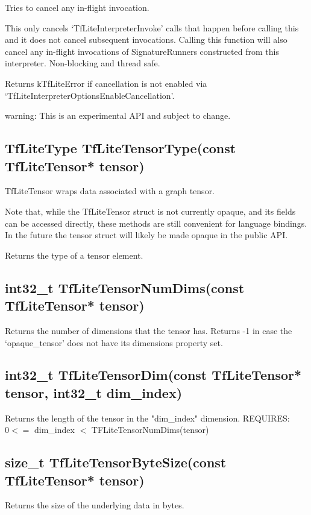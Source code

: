 \documentclass{ol-softwaremanual}
\begin{document}
Tries to cancel any in-flight invocation.

This only cancels `TfLiteInterpreterInvoke' calls that happen before
calling this and it does not cancel subsequent invocations.
Calling this function will also cancel any in-flight invocations of
SignatureRunners constructed from this interpreter.
Non-blocking and thread safe.

Returns kTfLiteError if cancellation is not enabled via
`TfLiteInterpreterOptionsEnableCancellation'.

warning: This is an experimental API and subject to change.

\subsection{TfLiteType TfLiteTensorType(const TfLiteTensor* tensor)}

TfLiteTensor wraps data associated with a graph tensor.

Note that, while the TfLiteTensor struct is not currently opaque, and its fields can be accessed directly, these methods are still convenient for language bindings. In the future the tensor struct will likely be made opaque in the public API.

Returns the type of a tensor element.

\subsection{int32\_t TfLiteTensorNumDims(const TfLiteTensor* tensor)}

Returns the number of dimensions that the tensor has.  Returns -1 in case the `opaque\_tensor' does not have its dimensions property set.

\subsection{int32\_t TfLiteTensorDim(const TfLiteTensor* tensor, int32\_t dim\_index)}

Returns the length of the tensor in the "dim\_index" dimension.
REQUIRES: $0 <=$ dim\_index $<$ TFLiteTensorNumDims(tensor)

\subsection{size\_t TfLiteTensorByteSize(const TfLiteTensor* tensor)}

Returns the size of the underlying data in bytes.
\end{document}
